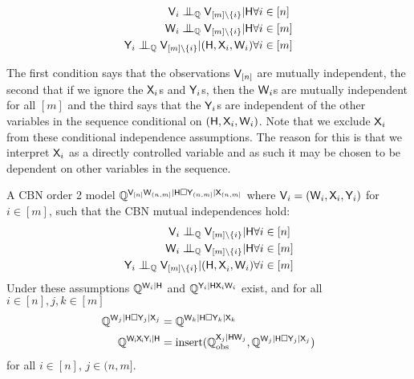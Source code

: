 \begin{align}
    \RV{V}_i\CI_{\prob{Q}} \RV{V}_{[m]\setminus \{i\}}|\RV{H}&\forall i\in [n]\\
    \RV{W}_i\CI_{\prob{Q}} \RV{V}_{[m]\setminus \{i\}}|\RV{H}&\forall i\in [m]\\
    \RV{Y}_i\CI_{\prob{Q}} \RV{V}_{[m]\setminus \{i\}}|(\RV{H},\RV{X}_i,\RV{W}_i)&\forall i\in [m]\\
\end{align}

The first condition says that the observations $\mathsf{V}_{[n]}$ are mutually independent, the second that if we ignore the $\mathsf{X}_i$s and $\mathsf{Y}_i$s, then the $\mathsf{W}_i$s are mutually independent for all $[m]$ and the third says that the $\mathsf{Y}_i$s are independent of the other variables in the sequence conditional on $(\mathsf{H},\mathsf{X}_i,\mathsf{W}_i)$. Note that we exclude $\mathsf{X}_i$ from these conditional independence assumptions. The reason for this is that we interpret $\mathsf{X}_i$ as a directly controlled variable and as such it may be chosen to be dependent on other variables in the sequence.

\begin{definition}\label{def:cbn_o2}
A CBN order 2 model $\mathbb{Q}^{\mathsf{V}_{[n]}\mathsf{W}_{(n,m]}|\mathsf{H}\square \mathsf{Y}_{(n,m]}|\mathsf{X}_{(n,m]}}$ where $\mathsf{V}_{i} = (\mathsf{W}_i,\mathsf{X}_i,\mathsf{Y}_i)$ for $i\in [m]$, such that the CBN mutual independences hold:
\begin{align}
    \RV{V}_i\CI_{\prob{Q}} \RV{V}_{[m]\setminus \{i\}}|\RV{H}&\forall i\in [n]\label{eq:cbn_ci1}\\
    \RV{W}_i\CI_{\prob{Q}} \RV{V}_{[m]\setminus \{i\}}|\RV{H}&\forall i\in [m]\label{eq:cbn_ci2}\\
    \RV{Y}_i\CI_{\prob{Q}} \RV{V}_{[m]\setminus \{i\}}|(\RV{H,X}_i,\RV{W}_i)&\forall i\in [m]\label{eq:cbn_ci3}\\
\end{align}
Under these assumptions $\mathbb{Q}^{\mathsf{W}_i|\mathsf{H}}$ and $\mathbb{Q}^{\mathsf{Y}_i|\mathsf{H}\mathsf{X}_i\mathsf{W}_i}$ exist, and for all $i\in [n],j,k\in [m]$
\begin{align}
    \mathbb{Q}^{\mathsf{W}_{j}|\mathsf{H}\square\mathsf{Y}_{j}|\mathsf{X}_{j}}&=\mathbb{Q}^{\mathsf{W}_{k}|\mathsf{H}\square\mathsf{Y}_{k}|\mathsf{X}_{k}}\label{eq:identically_distributed}\\
    \mathbb{Q}^{\mathsf{W_iX_iY_i}|\mathsf{H}} &= \text{insert}(\mathbb{Q}_{\text{obs}}^{\mathsf{X}_{j}|\mathsf{HW}_{j}},\mathbb{Q}^{\mathsf{W}_{j}|\mathsf{H}\square\mathsf{Y}_{j}|\mathsf{X}_{j}})\label{eq:cbn_insert}
\end{align}
for all $i\in[n]$, $j\in (n,m]$.
\end{definition}


